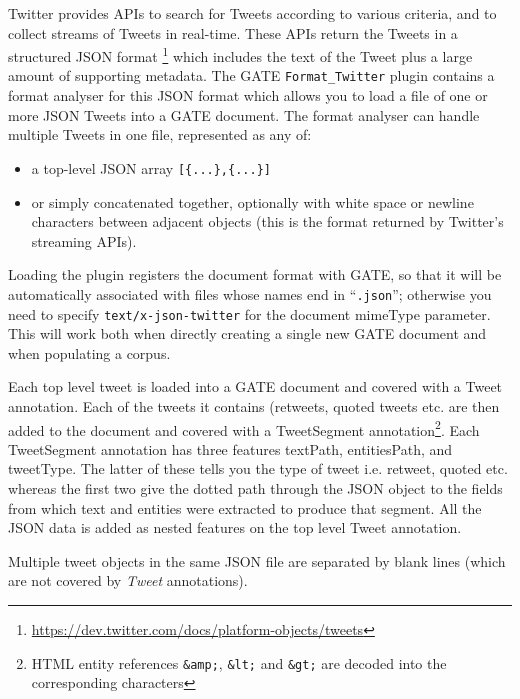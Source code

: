 %
Twitter provides APIs to search for Tweets according to various criteria, and
to collect streams of Tweets in real-time.  These APIs return the Tweets in a
structured JSON format%
\footnote{\url{https://dev.twitter.com/docs/platform-objects/tweets}} which
includes the text of the Tweet plus a large amount of supporting metadata.
The GATE \verb!Format_Twitter! plugin contains a format analyser for this JSON format
which allows you to load a file of one or more JSON Tweets into a GATE
document.  The format analyser can handle multiple Tweets in one file,
represented as any of:
\begin{itemize}
\item a top-level JSON array \verb![{...},{...}]!
\item or simply concatenated together, optionally with white space or newline
  characters between adjacent objects (this is the format returned by Twitter's
  streaming APIs).
\end{itemize}
Loading the plugin registers the
document format with GATE, so that it will be automatically associated with
files whose names end in ``\verb!.json!''; otherwise you need to specify
\verb!text/x-json-twitter! for the document mimeType parameter.  This will work
both when directly creating a single new GATE document and when populating a
corpus.

Each top level tweet is loaded into a GATE document and covered with a Tweet annotation.
Each of the tweets it contains (retweets, quoted tweets etc. are then added to the document
and covered with a TweetSegment annotation\footnote{HTML entity references \texttt{\&amp;}, \texttt{\&lt;} and
\texttt{\&gt;} are decoded into the corresponding characters}. Each TweetSegment annotation has three features
textPath, entitiesPath, and tweetType. The latter of these tells you the type of tweet i.e.
retweet, quoted etc. whereas the first two give the dotted path through the JSON object
to the fields from which text and entities were extracted to produce that segment.
All the JSON data is added as nested features on the top level Tweet annotation.

Multiple tweet objects in the same JSON file are separated by blank lines (which
are not covered by \emph{Tweet} annotations).


